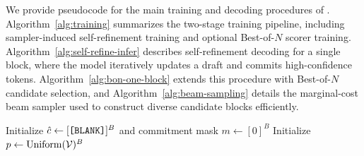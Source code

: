 We provide pseudocode for the main training and decoding procedures of \method. 
Algorithm~\ref{alg:training} summarizes the two-stage training pipeline, including sampler-induced self-refinement training and optional Best-of-$N$ scorer training. 
Algorithm~\ref{alg:self-refine-infer} describes self-refinement decoding for a single block, where the model iteratively updates a draft and commits high-confidence tokens. 
Algorithm~\ref{alg:bon-one-block} extends this procedure with Best-of-$N$ candidate selection, and Algorithm~\ref{alg:beam-sampling} details the marginal-cost beam sampler used to construct diverse candidate blocks efficiently.




\begin{algorithm}[!htbp]
    \SetAlgoLined
    \DontPrintSemicolon
    \SetNoFillComment
    \LinesNotNumbered
    \linespread{.86}\selectfont
    \caption{Self-Refinement Decoding for One Block}
    \label{alg:self-refine-infer}


    Initialize $\hat c \leftarrow [\texttt{[BLANK]}]^B$ and commitment mask $m\leftarrow[0]^B$\;
    Initialize $p \leftarrow \mathrm{Uniform}(\mathcal{V})^B$\;



    \;
\end{algorithm}

